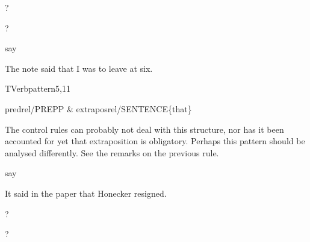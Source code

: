 
\begin{thetadescr}
\evitem ?
\esitem
     \begin{examples}
        \example  ?
     \end{examples}
\end{thetadescr}


\begin{thetadescr}
\evitem say
\esitem
     \begin{examples}
        \example  The note said that I was to leave at six.
     \end{examples}
\end{thetadescr}


\newpage
{}
\begin{vpattern}
 TVerbpattern5,11
\csritem \mbox{}\\
     \begin{csr}
     predrel/PREPP & extraposrel/SENTENCE\{that\}
     \end{csr}
\remarksitem The control rules can probably not deal with this structure, nor 
has it been accounted for yet that extraposition is obligatory. Perhaps this 
pattern should be analysed differently. See the remarks on the previous rule.
\end{vpattern}


\begin{thetadescr}
\evitem say
\esitem
     \begin{examples}
        \example  It said in the paper that Honecker resigned.
     \end{examples}
\end{thetadescr}


\begin{thetadescr}
\evitem ?
\esitem
     \begin{examples}
        \example  ?
     \end{examples}
\end{thetadescr}


\newpage
% 

